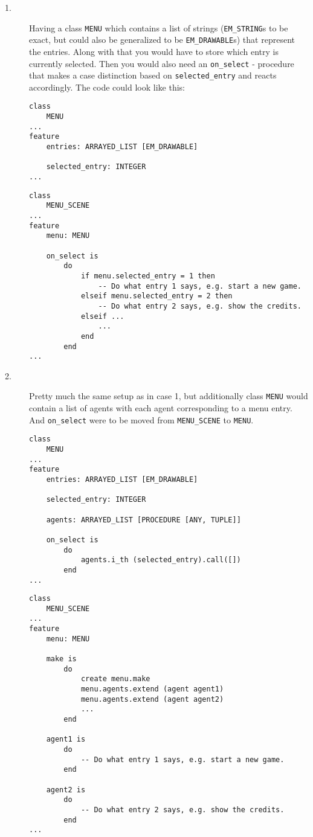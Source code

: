 \begin{description}
  \item[1.] Having a class \texttt{MENU} which contains a list of strings (\texttt{EM\_STRING}s to be exact, but could also be generalized to be \texttt{EM\_DRAWABLE}s) that represent the entries. Along with that you would have to store which entry is currently selected. Then you would also need an \texttt{on\_select} - procedure that makes a case distinction based on \texttt{selected\_entry} and reacts accordingly. The code could look like this: 
    \begin{lstlisting}
class
	MENU
...
feature
	entries: ARRAYED_LIST [EM_DRAWABLE]
	
	selected_entry: INTEGER
...
    \end{lstlisting}
    \begin{lstlisting}
class
	MENU_SCENE
...
feature
	menu: MENU
	
	on_select is
		do
			if menu.selected_entry = 1 then
				-- Do what entry 1 says, e.g. start a new game.
	  		elseif menu.selected_entry = 2 then
				-- Do what entry 2 says, e.g. show the credits.
			elseif ...
				...
			end
		end
...
    \end{lstlisting}
  \item[2.] Pretty much the same setup as in case 1, but additionally class \texttt{MENU} would contain a list of agents with each agent corresponding to a menu entry. And \texttt{on\_select} were to be moved from \texttt{MENU\_SCENE} to \texttt{MENU}.
    \begin{lstlisting}
class
	MENU
...
feature
	entries: ARRAYED_LIST [EM_DRAWABLE]
	
	selected_entry: INTEGER
	
	agents: ARRAYED_LIST [PROCEDURE [ANY, TUPLE]]

	on_select is
		do
			agents.i_th (selected_entry).call([])
		end
...
    \end{lstlisting}  
    \begin{lstlisting}
class
	MENU_SCENE
...
feature
	menu: MENU
	
	make is
		do
			create menu.make
			menu.agents.extend (agent agent1)
			menu.agents.extend (agent agent2)
			...
		end
		
	agent1 is
		do
			-- Do what entry 1 says, e.g. start a new game.
		end
		
	agent2 is
		do
			-- Do what entry 2 says, e.g. show the credits.
		end
...	
    \end{lstlisting}


\end{description}
